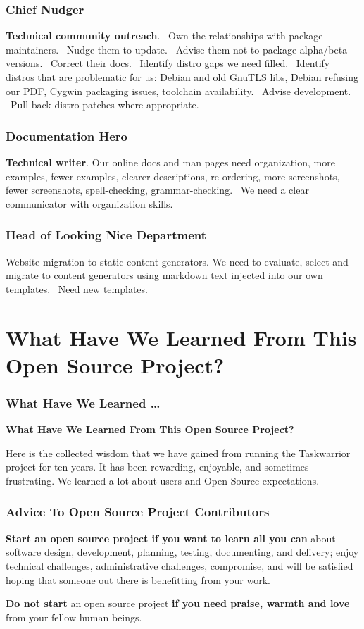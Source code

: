 \documentclass[t,handout]{beamer}
\begin{document}
\begin{frame}[fragile]\frametitle{Chief Nudger}
    \vfill
    \textbf{Technical community outreach}.  Own the relationships with package maintainers.  Nudge them to update.  Advise them not to package alpha/beta versions.  Correct their docs.  Identify distro gaps we need filled.  Identify distros that are problematic for us: Debian and old GnuTLS libs, Debian refusing our PDF, Cygwin packaging issues, toolchain availability.  Advise development.  Pull back distro patches where appropriate.
\end{frame}

\begin{frame}[fragile]\frametitle{Documentation Hero}
    \vfill
    \textbf{Technical writer}. Our online docs and man pages need organization, more examples, fewer examples, clearer descriptions, re-ordering, more screenshots, fewer screenshots, spell-checking, grammar-checking.  We need a clear communicator with organization skills.
\end{frame}

\begin{frame}[fragile]\frametitle{Head of Looking Nice Department}
    \vfill
    Website migration to static content generators. We need to evaluate, select and migrate to content generators using markdown text injected into our own templates.  Need new templates.
\end{frame}

\section{What Have We Learned From This Open Source Project?}

\begin{frame}[fragile]\frametitle{What Have We Learned \ldots}
    \vfill
    \textbf{What Have We Learned From This Open Source Project?}

    Here is the collected wisdom that we have gained from running the Taskwarrior project for ten years. It has been rewarding, enjoyable, and sometimes frustrating. We learned a lot about users and Open Source expectations.
    \vfill
\end{frame}

\begin{frame}[fragile]\frametitle{Advice To Open Source Project Contributors}
    \vfill
    \textbf{Start an open source project if you want to learn all you can} about software design, development, planning, testing, documenting, and delivery; enjoy technical challenges, administrative challenges, compromise, and will be satisfied hoping that someone out there is benefitting from your work.

    \textbf{Do not start} an open source project \textbf{if you need praise, warmth and love} from your fellow human beings.
    \vfill
\end{frame}
\end{document}
